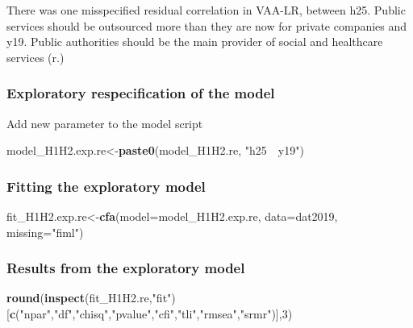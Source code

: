 \documentclass[
]{article}
\newenvironment{Shaded}{\begin{snugshade}}{\end{snugshade}}
\newcommand{\DataTypeTok}[1]{\textcolor[rgb]{0.13,0.29,0.53}{#1}}
\newcommand{\DecValTok}[1]{\textcolor[rgb]{0.00,0.00,0.81}{#1}}
\newcommand{\KeywordTok}[1]{\textcolor[rgb]{0.13,0.29,0.53}{\textbf{#1}}}
\newcommand{\NormalTok}[1]{#1}
\newcommand{\StringTok}[1]{\textcolor[rgb]{0.31,0.60,0.02}{#1}}
\begin{document}
There was one misspecified residual correlation in VAA-LR, between h25.
Public services should be outsourced more than they are now for private
companies and y19. Public authorities should be the main provider of
social and healthcare services (r.)

\hypertarget{exploratory-respecification-of-the-model}{%
\subsubsection{Exploratory respecification of the
model}\label{exploratory-respecification-of-the-model}}

Add new parameter to the model script

\begin{Shaded}
\begin{Highlighting}[]
\NormalTok{model_H1H2.exp.re<-}\KeywordTok{paste0}\NormalTok{(model_H1H2.re,}
                      \StringTok{"h25~~y19"}\NormalTok{)}
\end{Highlighting}
\end{Shaded}

\hypertarget{fitting-the-exploratory-model}{%
\subsubsection{Fitting the exploratory
model}\label{fitting-the-exploratory-model}}

\begin{Shaded}
\begin{Highlighting}[]
\NormalTok{fit_H1H2.exp.re<-}\KeywordTok{cfa}\NormalTok{(}\DataTypeTok{model=}\NormalTok{model_H1H2.exp.re,}
              \DataTypeTok{data=}\NormalTok{dat2019,}
              \DataTypeTok{missing=}\StringTok{"fiml"}\NormalTok{)}
\end{Highlighting}
\end{Shaded}

\hypertarget{results-from-the-exploratory-model}{%
\subsubsection{Results from the exploratory
model}\label{results-from-the-exploratory-model}}

\begin{Shaded}
\begin{Highlighting}[]
\KeywordTok{round}\NormalTok{(}\KeywordTok{inspect}\NormalTok{(fit_H1H2.re,}\StringTok{"fit"}\NormalTok{)}
\NormalTok{      [}\KeywordTok{c}\NormalTok{(}\StringTok{"npar"}\NormalTok{,}\StringTok{"df"}\NormalTok{,}\StringTok{"chisq"}\NormalTok{,}\StringTok{"pvalue"}\NormalTok{,}\StringTok{"cfi"}\NormalTok{,}\StringTok{"tli"}\NormalTok{,}\StringTok{"rmsea"}\NormalTok{,}\StringTok{"srmr"}\NormalTok{)],}\DecValTok{3}\NormalTok{)}
\end{Highlighting}
\end{Shaded}
\end{document}
